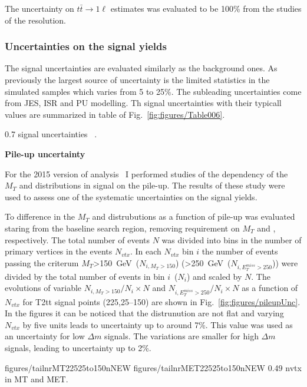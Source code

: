 The uncertainty on $t\bar{t} \to 1\ell$ estimates was evaluated to be 100\% from the studies of the \MET resolution.

\subsubsection{Uncertainties on the signal yields}

The signal uncertainties are evaluated similarly as the background ones.  As previously the largest source of uncertainty is the limited statistics in the simulated samples which varies from 5 to 25\%. The subleading uncertainties come from JES, ISR and PU modelling. Th signal uncertainties with their typicall values are summarized in table of Fig.~\ref{fig:figures/Table006}.

                 {0.7}       %
                 { signal uncertainties ~\cite{Sirunyan:2017xse}. }

\textbf{Pile-up uncertainty}

For the 2015 version of analysis~\cite{Sirunyan:2016jpr} I performed studies of the dependency of the $M_{T}$ and \MET distributions in signal on the pile-up. The results of these study were used to assess one of the systematic uncertainties on the signal yields.

To difference in the $M_{T}$ and \MET distrubutions as a function of pile-up was evaluated staring from the baseline search region, removing requirement on $M_{T}$ and \MET, respectively. The total number of events $N$ was divided into bins in the number of primary vertices in the events $N_{vtx}$. In each $N_{vtx}$ bin $i$ the number of events passing the criterum $M_{T}$>150~GeV~($N_{i,M_{T}>150}$) (\MET>250~GeV~($N_{i,E_{T}^{miss}>250}$)) were divided by the total number of events in bin $i$~($N_{i}$) and scaled by $N$. The evolutions of variable $N_{i,M_{T}>150}/N_{i} \times N$ and $N_{i,E_{T}^{miss}>250}/N_{i} \times N$ as a function of $N_{vtx}$ for T2tt signal points (225,25--150) are shown in Fig.~\ref{fig:figures/pileupUnc}. In the figures it can be noticed that  the distrunution are not flat and varying $N_{vtx}$ by five units leads to uncertainty up to around 7\%. This value was used as an uncertainty for low $\Delta m$ signals. The variations are smaller for high $\Delta m$ signals, leading to uncertainty up to 2\%.

                 {figures/tailnrMT22525to150nNEW} %
                 {figures/tailnrMET22525to150nNEW} %
                 {0.49}       %
                 { nvtx in MT and MET. }
\newpage

